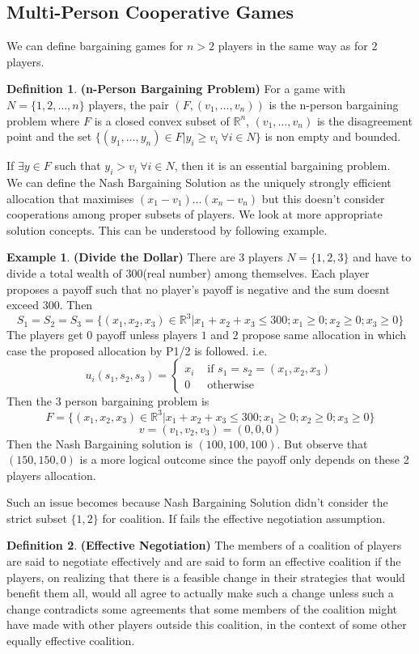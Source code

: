 \documentclass{article}
\theoremstyle{definition}
\newtheorem{defn}{Definition}[section]
\newtheorem{example}{Example}[section]
\begin{document}
\subsection{Multi-Person Cooperative Games}
We can define bargaining games for $n>2$ players in the same way as for $2$ players.
\begin{defn}
\textbf{(n-Person Bargaining Problem)} For a game with $N = \{1,2,\dots,n\}$ players, the pair $(F,(v_1,\dots,v_n))$ is the n-person bargaining problem where $F$ is a closed convex subset of $\mathbb{R}^n$, $(v_1,\dots,v_n)$ is the disagreement point and the set $\{(y_1,\dots,y_n)\in F| y_i\geq v_i ~\forall i\in N\}$ is non empty and bounded.
\end{defn}
If $\exists y\in F$ such that $y_i>v_i~\forall i\in N$, then it is an essential bargaining problem.\\
We can define the Nash Bargaining Solution as the uniquely strongly efficient allocation that maximises $(x_1-v_1)\dots(x_n-v_n)$ but this doesn't consider cooperations among proper subsets of players. We look at more appropriate solution concepts. This can be understood by following example.
\begin{example}
\textbf{(Divide the Dollar)} There are 3 players $N = \{1,2,3\}$ and have to divide a total wealth of $300$(real number) among themselves. Each player proposes a payoff such that no player's payoff is negative and the sum doesnt exceed 300. Then $$S_1 = S_2 = S_3 = \{(x_1,x_2,x_3)\in \mathbb{R}^3|x_1+x_2+x_3\leq 300;x_1\geq0;x_2\geq 0;x_3\geq 0\}$$ The players get $0$ payoff unless players $1$ and $2$ propose same allocation in which case the proposed allocation by P1/2 is followed. i.e.
\[u_i(s_1,s_2,s_3) =
\begin{cases}
x_i &\text{ if }s_1 = s_2 = (x_1,x_2,x_3)\\
0 &\text{ otherwise}
\end{cases}
\]
Then the 3 person bargaining problem is $$F = \{(x_1,x_2,x_3)\in \mathbb{R}^3|x_1+x_2+x_3\leq 300;x_1\geq0;x_2\geq 0;x_3\geq 0\}$$
$$v = (v_1,v_2,v_3) = (0,0,0)$$
Then the Nash Bargaining solution is $(100,100,100)$. But observe that $(150,150,0)$ is a more logical outcome since the payoff only depends on these 2 players allocation.
\end{example}
Such an issue becomes because Nash Bargaining Solution didn't consider the strict subset $\{1,2\}$ for coalition. If fails the effective negotiation assumption.
\begin{defn}
\textbf{(Effective Negotiation)} The members of a coalition of players are said to negotiate effectively and are said to form an effective coalition if the players, on realizing that there is a feasible change in their strategies that would benefit them all, would all agree to actually make such a change unless such a change contradicts some agreements that some members of the coalition might have made with other players outside this coalition, in the context of some other equally effective coalition.
\end{defn}
\end{document}
